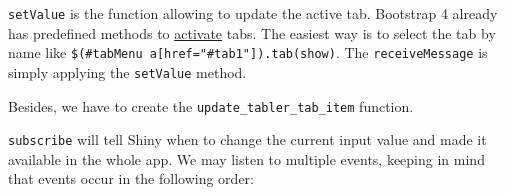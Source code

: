 \documentclass[]{book}
\newenvironment{Shaded}{\begin{snugshade}}{\end{snugshade}}
\newcommand{\AttributeTok}[1]{\textcolor[rgb]{0.77,0.63,0.00}{#1}}
\newcommand{\ControlFlowTok}[1]{\textcolor[rgb]{0.13,0.29,0.53}{\textbf{#1}}}
\newcommand{\DataTypeTok}[1]{\textcolor[rgb]{0.13,0.29,0.53}{#1}}
\newcommand{\KeywordTok}[1]{\textcolor[rgb]{0.13,0.29,0.53}{\textbf{#1}}}
\newcommand{\NormalTok}[1]{#1}
\newcommand{\OperatorTok}[1]{\textcolor[rgb]{0.81,0.36,0.00}{\textbf{#1}}}
\newcommand{\SpecialCharTok}[1]{\textcolor[rgb]{0.00,0.00,0.00}{#1}}
\newcommand{\StringTok}[1]{\textcolor[rgb]{0.31,0.60,0.02}{#1}}
\newcommand{\VerbatimStringTok}[1]{\textcolor[rgb]{0.31,0.60,0.02}{#1}}
\begin{document}
\texttt{setValue} is the function allowing to update the active tab. Bootstrap 4 already has
predefined methods to \href{https://getbootstrap.com/docs/4.0/components/navs/\#via-javascript}{activate} tabs. The easiest way is to select the tab by name like \texttt{\$(\textquotesingle{}\#tabMenu\ a{[}href="\#tab1"{]}\textquotesingle{}).tab(\textquotesingle{}show\textquotesingle{})}. The \texttt{receiveMessage} is simply applying the \texttt{setValue} method.

\begin{Shaded}
\end{Shaded}

Besides, we have to create the \texttt{update\_tabler\_tab\_item} function.

\begin{Shaded}
\end{Shaded}

\texttt{subscribe} will tell Shiny when to change the current input value and made it available
in the whole app. We may listen to multiple events, keeping in mind that events occur in the following order:
\end{document}
